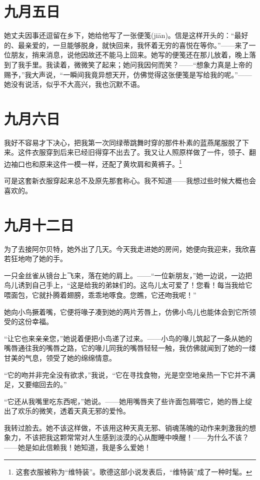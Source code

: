 \documentclass[12pt,oneside]{book}
\begin{document}
\chapter{九月五日}
她丈夫因事还逗留在乡下，她给他写了一张便笺(jiān)。信是这样开头的：“最好的、最亲爱的，一旦能够脱身，就快回来，我怀着无穷的喜悦在等你。”——来了一位朋友，捎来消息，说他因故还不能马上回来。她写的便笺还在那儿放着，晚上落到了我手里。我读着，微微笑了起来；她问我因何而笑？——“想象力真是上帝的赐予，”我大声说，“一瞬间我竟异想天开，仿佛觉得这张便笺是写给我的呢。”——她没有说活，似乎不大高兴，我也沉默不语。
　　
\chapter{九月六日}
我好不容易才下决心，把我第一次同绿蒂跳舞时穿的那件朴素的蓝燕尾服脱了下来。这件衣服穿到后来已经旧得穿不出去了。我又让人照原样做了一件，领子、翻边袖口也和原来这件一模一样，还配了黄坎肩和黄裤子。\footnote{这套衣服被称为“维特装”。歌德这部小说发表后，“维特装”成了一种时髦。}

可是这套新衣服穿起来总不及原先那套称心。我不知道——我想过些时候大概也会喜欢的。
　　

\chapter{九月十二日}
为了去接阿尔贝特，她外出了几天。今天我走进她的房间，她便向我迎来，我欣喜若狂地吻了她的手。

一只金丝雀从镜台上飞来，落在她的肩上。——“一位新朋友，”她一边说，一边把鸟儿诱到自己手上，“这是给我的弟妹们的。这鸟儿太可爱了！您看！每当我给它喂面包，它就扑腾着翅膀，乖乖地啄食。您瞧，它还吻我呢！”

她向小鸟撅着嘴，它便将喙子凑到她的两片芳唇上，仿佛小鸟儿也能体会到它所领受的这份幸福。

“让它也来亲亲您，”她说着便把小鸟递了过来。——小鸟的喙儿筑起了一条从她的嘴唇通往我的嘴唇之路，它的喙儿同我的嘴唇轻轻一触，我仿佛就闻到了她的一缕甘美的气息，领受了她的绵绵情意。

“它的吻并非完全没有欲求，”我说，“它在寻找食物，光是空空地亲热一下它并不满足，又要缩回去的。”

“它还从我嘴里吃东西呢，”她说。——她用嘴唇夹了些许面包屑喂它，她的唇上绽出了欢乐的微笑，透着天真无邪的爱怜。

我转过脸去。她不该这样做，不该用这种天真无邪、销魂荡魄的动作来刺激我的想象力，不该把我这颗常常对人生感到淡漠的心从酣睡中唤醒！——为什么不该？——她是如此信赖我！她知道，我是多么爱她！
　　
\end{document}

